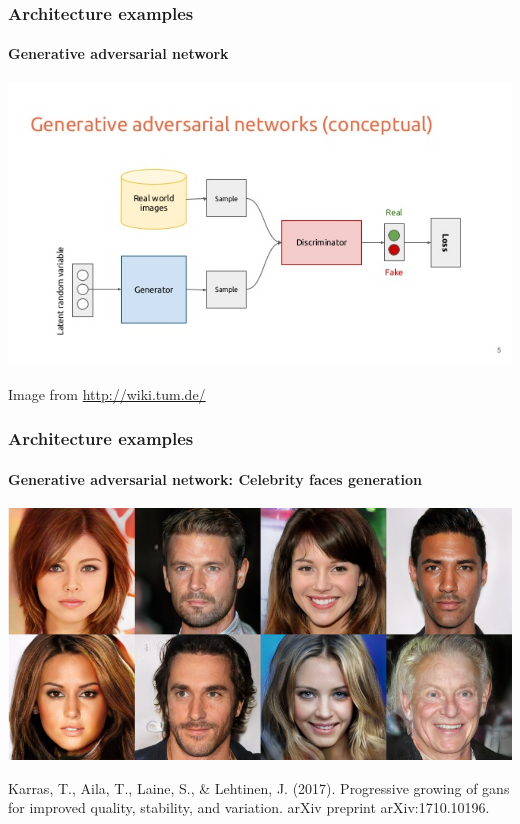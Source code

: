 \documentclass[9pt]{beamer}
\begin{document}
\begin{frame}
  \frametitle{Architecture examples}

  \framesubtitle{Generative adversarial network}

  \begin{center}
    \includegraphics[width=\linewidth]{images/GAN_1.jpg}
  \end{center}

  {\small Image from \url{http://wiki.tum.de/}}
\end{frame}

\begin{frame}
  \frametitle{Architecture examples}

  \framesubtitle{Generative adversarial network: Celebrity faces generation}

  \begin{center}
    \includegraphics[width=0.7\linewidth]{images/progan.png}
  \end{center}

  \bigskip

  {\footnotesize Karras, T., Aila, T., Laine, S., \& Lehtinen,
    J. (2017). Progressive growing of gans for improved quality,
    stability, and variation. arXiv preprint arXiv:1710.10196.}
\end{frame}
\end{document}
